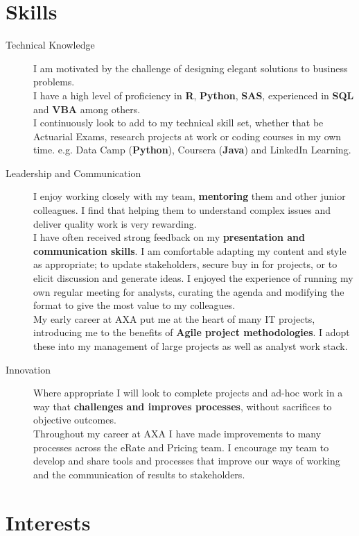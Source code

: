 \documentclass[11pt]{article}
\begin{document}
\section*{Skills}
\begin{description}

\item[Technical Knowledge] I am motivated by the challenge of designing elegant solutions to business problems. \\
I have a high level of proficiency in \textbf{R}, \textbf{Python}, \textbf{SAS}, experienced in \textbf{SQL} and \textbf{VBA} among others.\\
I continuously look to add to my technical skill set, whether that be Actuarial Exams, research projects at work or coding courses in my own time. e.g. Data Camp (\textbf{Python}), Coursera (\textbf{Java}) and LinkedIn Learning.

\item[Leadership and Communication] I enjoy working closely with my team, \textbf{mentoring} them and other junior colleagues. I find that helping them to understand complex issues and deliver quality work is very rewarding. \\
I have often received strong feedback on my \textbf{presentation and communication skills}. I am comfortable adapting my content and style as appropriate; to update stakeholders, secure buy in for projects, or to elicit discussion and generate ideas.
I enjoyed the experience of running my own regular meeting for analysts, curating the agenda and modifying the format to give the most value to my colleagues.\\
My early career at AXA put me at the heart of many IT projects, introducing me to the benefits of \textbf{Agile project methodologies}. I adopt these into my management of large projects as well as analyst work stack.

\item[Innovation] Where appropriate I will look to complete projects and ad-hoc work in a way that \textbf{challenges and improves processes}, without sacrifices to objective outcomes.\\
Throughout my career at AXA I have made improvements to many processes across the eRate and Pricing team. I encourage my team to develop and share tools and processes that improve our ways of working and the communication of results to stakeholders.
\end{description} 

\section*{Interests}
\end{document}

